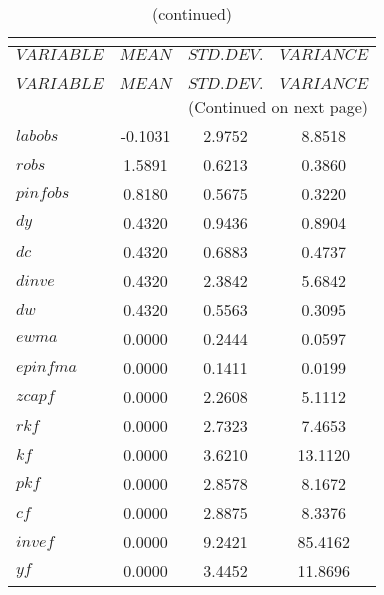 
\begin{center}
\begin{longtable}{lccc} 
\caption{THEORETICAL MOMENTS}\\
 \label{Table:th_moments}\\
\toprule 
$VARIABLE  $	 & 	 $         MEAN$	 & 	 $    STD. DEV.$	 & 	 $     VARIANCE$\\
\midrule \endfirsthead 
\caption{(continued)}\\
 \toprule \\ 
$VARIABLE  $	 & 	 $         MEAN$	 & 	 $    STD. DEV.$	 & 	 $     VARIANCE$\\
\midrule \endhead 
\midrule \multicolumn{4}{r}{(Continued on next page)} \\ \bottomrule \endfoot 
\bottomrule \endlastfoot 
$labobs    $	 & 	      -0.1031	 & 	       2.9752	 & 	       8.8518 \\ 
$robs      $	 & 	       1.5891	 & 	       0.6213	 & 	       0.3860 \\ 
$pinfobs   $	 & 	       0.8180	 & 	       0.5675	 & 	       0.3220 \\ 
$dy        $	 & 	       0.4320	 & 	       0.9436	 & 	       0.8904 \\ 
$dc        $	 & 	       0.4320	 & 	       0.6883	 & 	       0.4737 \\ 
$dinve     $	 & 	       0.4320	 & 	       2.3842	 & 	       5.6842 \\ 
$dw        $	 & 	       0.4320	 & 	       0.5563	 & 	       0.3095 \\ 
$ewma      $	 & 	       0.0000	 & 	       0.2444	 & 	       0.0597 \\ 
$epinfma   $	 & 	       0.0000	 & 	       0.1411	 & 	       0.0199 \\ 
$zcapf     $	 & 	       0.0000	 & 	       2.2608	 & 	       5.1112 \\ 
$rkf       $	 & 	       0.0000	 & 	       2.7323	 & 	       7.4653 \\ 
$kf        $	 & 	       0.0000	 & 	       3.6210	 & 	      13.1120 \\ 
$pkf       $	 & 	       0.0000	 & 	       2.8578	 & 	       8.1672 \\ 
$cf        $	 & 	       0.0000	 & 	       2.8875	 & 	       8.3376 \\ 
$invef     $	 & 	       0.0000	 & 	       9.2421	 & 	      85.4162 \\ 
$yf        $	 & 	       0.0000	 & 	       3.4452	 & 	      11.8696 \\ 

\end{longtable}
\end{center}
